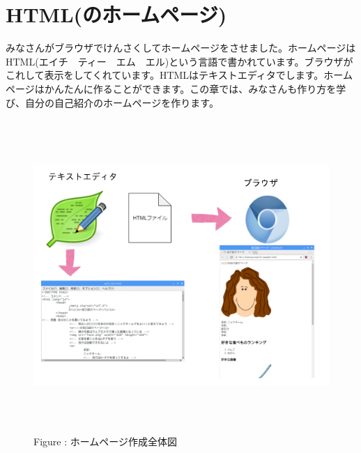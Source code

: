 \documentclass[a4paper,12pt]{jarticle}
\begin{document}
\section{HTML(のホームページ)}
みなさんがブラウザでけんさくしてホームページをさせました。ホームページはHTML(エイチ　ティー　エム　エル)という言語で書かれています。ブラウザがこれして表示をしてくれています。HTMLはテキストエディタでします。ホームページはかんたんに作ることができます。この章では、みなさんも作り方を学び、自分の自己紹介のホームページを作ります。


\bigskip


\bigskip


\bigskip


\bigskip



\begin{figure}[hb]
  \centering
  \begin{minipage}{15.801cm}
    {\upshape
      \includegraphics[width=15.801cm,height=11.85cm]{textbook-img140.png}
      \newline
      Figure : ホームページ作成全体図}
  \end{minipage}
\end{figure}
\clearpage
\end{document}

